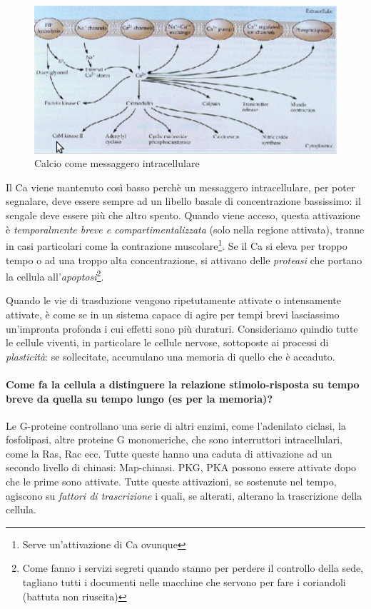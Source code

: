 \documentclass[a4paper,12pt]{article}
\begin{document}
\begin{figure}[H]
\centering
\includegraphics[scale=0.4]{immagine/calcio.jpg}
\caption{Calcio come messaggero intracellulare}
\end{figure}

Il Ca viene mantenuto così basso perchè un messaggero intracellulare, per poter segnalare, deve essere sempre ad un libello basale di concentrazione bassissimo: il sengale deve essere più che altro spento. Quando viene acceso, questa attivazione è \emph{temporalmente breve e compartimentalizzata} (solo nella regione attivata), tranne in casi particolari come la contrazione muscolare\footnote{Serve un'attivazione di Ca ovunque}.
Se il Ca si eleva per troppo tempo o ad una troppo alta concentrazione, si attivano delle \emph{proteasi} che portano la cellula all'\emph{apoptosi}\footnote{Come fanno i servizi segreti quando stanno per perdere il controllo della sede, tagliano tutti i documenti nelle macchine che servono per fare i coriandoli (battuta non riuscita)}.

Quando le vie di trasduzione vengono ripetutamente attivate o intensamente attivate, è come se in un sistema capace di agire per tempi brevi lasciassimo un'impronta profonda i cui effetti sono più duraturi. Consideriamo quindio tutte le cellule viventi, in particolare le cellule nervose, sottoposte ai processi di \emph{plasticità}: se sollecitate, accumulano una memoria di quello che è accaduto. 

\paragraph{Come fa la cellula a distinguere la relazione stimolo-risposta su tempo breve da quella su tempo lungo (es per la memoria)?}

Le G-proteine controllano una serie di altri enzimi, come l'adenilato ciclasi, la fosfolipasi, altre proteine G monomeriche, che sono interruttori intracellulari, come la Ras, Rac ecc. Tutte queste hanno una caduta di attivazione ad un secondo livello di chinasi: Map-chinasi. PKG, PKA possono essere attivate dopo che le prime sono attivate. Tutte queste attivazioni, se sostenute nel tempo, agiscono su \emph{fattori di trascrizione} i quali, se alterati, alterano la trascrizione della cellula.
\end{document}

